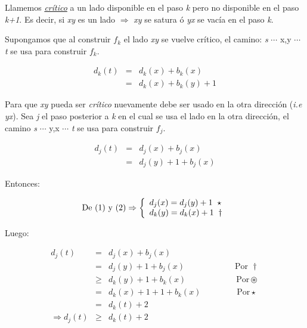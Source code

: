 \documentclass[12pt,a4paper]{report}
\begin{document}
		Llamemos \textit{\underline{crítico}} a un lado disponible en el paso \textit{k} pero no disponible en el paso \textit{k+1}. Es decir, si \textit{xy} es un lado $\Rightarrow$ \textit{xy} se satura ó \textit{yx} se vacía en el paso \textit{k}.
		
		Supongamos que al construir $f_{k}$ el lado \textit{xy} se vuelve crítico, el camino: \textit{s} $\dotsb$ x,y $\dotsb$ \textit{t} se usa para construir $f_{k}$.

		\begin{eqnarray}
			 d_{k}(\textit{t}) & = & d_{k}(x)+ b_{k}(x) \\
			\nonumber & = & d_{k}(x)+b_{k}(y)+1
		\end{eqnarray}
		
		 Para que \textit{xy} pueda ser \textit{crítico} nuevamente debe ser usado en la otra dirección (\textit{i.e yx}). Sea \textit{j} el paso posterior a \textit{k} en el cual se usa el lado en la otra dirección, el camino \textit{s} $\dotsb$ y,x $\dotsb$ \textit{t} se usa para construir $f_{j}$.
		
		\begin{eqnarray}
			d_{j}(\textit{t}) & = & d_{j}(x)+ b_{j}(x) \\
			\nonumber & = & d_{j}(y)+1+b_{j}(x)
		\end{eqnarray}
		
		Entonces:
		
		\begin{equation*}
			\textup{De (1) y (2)} \Rightarrow
  			\left \lbrace
  			\begin{array}{l}
    		 d_{j}(x) = d_{j}(y)+1 \; \; \star \\
     		 d_{k}(y) = d_{k}(x)+1 \; \; \dag\\
  			\end{array}
  			\right.
		\end{equation*}
		
		Luego:

		\begin{eqnarray}
			\nonumber d_{j}(\textit{t}) & = & d_{j}(x)+ b_{j}(x) \\
			\nonumber & = & d_{j}(y)+1+b_{j}(x) \qquad\qquad\qquad\text{Por } \dag\\
			\nonumber & \geq & d_{k}(y)+1+b_{k}(x) \qquad\qquad\qquad\text{Por} \circledast \\
			\nonumber & = & d_{k}(x)+1+1+b_{k}(x) \;\qquad\qquad\text{Por} \star \\
			\nonumber & = & d_{k}(\textit{t})+2 \\
			\nonumber \Rightarrow d_{j}(\textit{t}) & \geq & d_{k}(\textit{t})+2
		\end{eqnarray}
		
\end{document}
